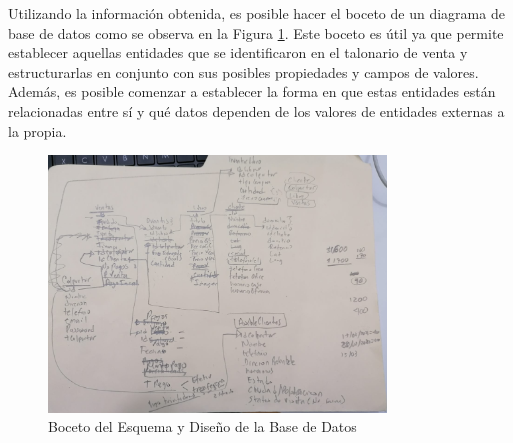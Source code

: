 \documentclass[runningheads]{llncs}
\begin{document}
                Utilizando la información obtenida, es posible hacer el boceto de un diagrama de base de datos como se observa en la Figura \ref{fig7}.
                Este boceto es útil ya que permite establecer aquellas entidades que se identificaron en el talonario de venta y estructurarlas en conjunto con sus posibles propiedades y campos de valores. Además, es posible comenzar a establecer la forma en que estas entidades están relacionadas entre sí y qué datos dependen de los valores de entidades externas a la propia.
                \begin{figure}[H]
                    \centering\captionsetup{width=0.8\textwidth}
                    \includegraphics[width=0.8\textwidth]{figures/db_diagrams/boceto_diagrama_bd.png}
                    \caption{Boceto del Esquema y Diseño de la Base de Datos} \label{fig7}
                \end{figure}
\end{document}
